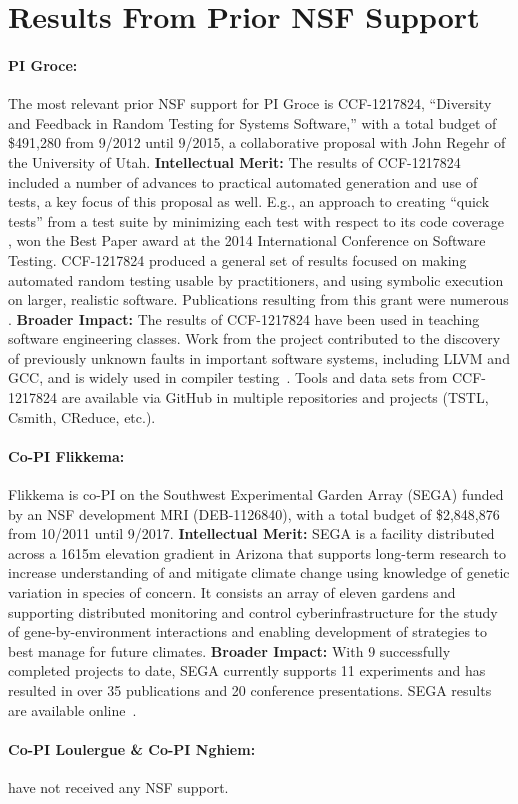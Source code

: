 \section{Results From Prior NSF Support}

\paragraph{PI Groce:}
The most relevant prior NSF support for PI Groce is
CCF-1217824, ``Diversity and Feedback in Random Testing for Systems
Software,'' with a total budget of \$491,280 from 9/2012 until 9/2015,
a collaborative proposal with John Regehr of the University of
Utah. {\bf Intellectual Merit:} The results of CCF-1217824 included a
number of advances to practical automated generation and use of tests,
a key focus of this proposal as well.  E.g., an approach to creating ``quick
tests'' from a test suite by minimizing each
test with respect to its code coverage \cite{icst2014}, won the
Best Paper award at the 2014 International Conference on Software
Testing.  CCF-1217824
produced a general set of results focused on making automated random
testing usable by practitioners, and using symbolic execution on
larger, realistic software.  Publications resulting from this grant
were numerous
\cite{Onward14,PLDI13,issta14,icst2014,helphelp,DirectedSwarm,stvrcausereduce,tstlsttt,ISSTA15,ASEAdeq}. {\bf
  Broader
  Impact:} The results of CCF-1217824 have been used in teaching software
engineering classes.
Work from the project contributed to the discovery of previously
unknown faults in important software
systems, including LLVM and GCC, and is widely used in compiler
testing~\cite{ZhendongPLDI14,beginnerluck,dewey2015fuzzing,le2015randomized}.
Tools and data sets from CCF-1217824 are available via GitHub in
multiple repositories and projects (TSTL, Csmith, CReduce, etc.).

\paragraph{Co-PI Flikkema:} Flikkema is co-PI on the Southwest Experimental Garden Array (SEGA)
funded by an NSF development MRI
(DEB-1126840), with a total budget of \$2,848,876 from 10/2011 until
9/2017. {\bf Intellectual Merit:} SEGA is a facility
distributed across a 1615m elevation gradient in Arizona that supports
long-term research to increase understanding of and mitigate climate
change using knowledge of genetic variation in species of concern. It
consists an array of eleven gardens and supporting distributed
monitoring and control cyberinfrastructure for the study of
gene-by-environment interactions and enabling development of
strategies to best manage for future climates. {\bf Broader
  Impact:}  With 9 successfully completed projects to date, SEGA
currently supports 11 experiments and has resulted in over 35
publications and 20 conference presentations.  SEGA results are
available online~\cite{SEGA}.

\paragraph{Co-PI Loulergue \& Co-PI Nghiem:} have not received any NSF support.

